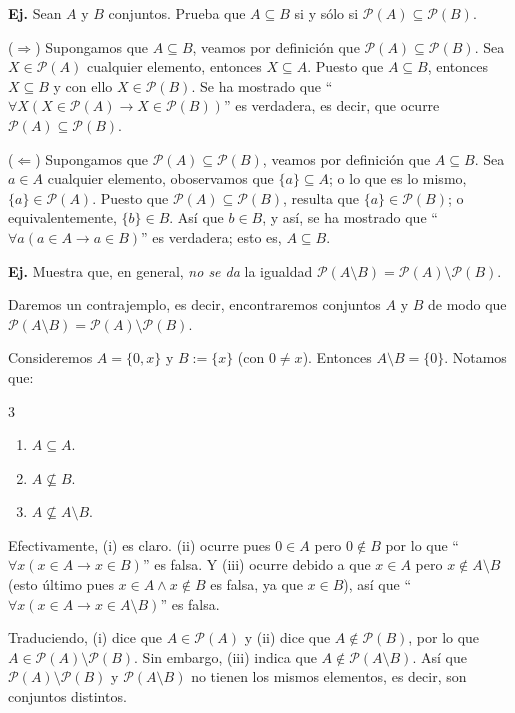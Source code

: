 \documentclass[letterpaper,DIV=14,headsepline,12pt]{scrartcl}
\makeatletter
\newcounter{Ejer}
\newcommand{\pts}{}
\newenvironment{ejercicio}[1]{\noindent
    \ifthenelse{\equal{#1}{1} \OR \equal{#1}{+1}}{\renewcommand{\pts}{\textbf{(#1 pt)}}}{\renewcommand{\pts}{\textbf{(#1 pts)}}}\textbf{Ej. \theEjer} \pts\stepcounter{Ejer}}{\vspace{.3cm}}
\renewenvironment{proof}[1][]{%
        \par\pushQED{\qed}%
        \normalfont\topsep6pt \partopsep0pt %
        \trivlist
        \item[\hskip\labelsep
                \textbf{\textit{Demostración.}}%
        ]#1
        }{%
        \popQED\endtrivlist\@endpefalse
    }
\newenvironment{solu}[1][]{%
        \par\pushQED{\hfill \lozenge}%
        \normalfont\topsep6pt \partopsep0pt %
        \trivlist
        \item[\hskip\labelsep
                \textbf{\textit{Solución.}}%
        ]#1
        }{%
        \popQED\endtrivlist\@endpefalse
    }
\makeatother
\begin{document}
    \begin{ejercicio}{1}
        Sean $A$ y $B$ conjuntos. Prueba que $A \subseteq B$ si y sólo si $\mathscr{P}(A) \subseteq \mathscr{P}(B)$.
    \end{ejercicio}
    \begin{proof}
        ($\Rightarrow$) Supongamos que $A \subseteq B$, veamos por definición que $\mathscr{P}(A) \subseteq \mathscr{P}(B)$. Sea $X \in \mathscr{P}(A)$ cualquier elemento, entonces $X \subseteq A$. Puesto que $A \subseteq B$, entonces $X \subseteq B$ y con ello $X \in \mathscr{P}(B)$. Se ha mostrado que ``$ \forall X (X \in \mathscr{P}(A) \to X \in \mathscr{P}(B)) $'' es verdadera, es decir, que ocurre $\mathscr{P}(A) \subseteq \mathscr{P}(B)$.

        ($\Leftarrow$) Supongamos que $\mathscr{P}(A) \subseteq \mathscr{P}(B)$, veamos por definición que $A \subseteq B$. Sea $a \in A$ cualquier elemento, oboservamos que $\{a\} \subseteq A$; o lo que es lo mismo, $\{a\} \in \mathscr{P}(A)$. Puesto que $\mathscr{P}(A) \subseteq \mathscr{P}(B)$, resulta que $\{a\} \in \mathscr{P}(B)$; o equivalentemente, $\{b\} \in B$. Así que $b \in B$, y así, se ha mostrado que ``$\forall a (a \in A \to a \in B)$'' es verdadera; esto es, $A \subseteq B$.
    \end{proof}

    \begin{ejercicio}{1}
        Muestra que, en general, \textit{no se da} la igualdad $\mathscr{P}(A \setminus B) = \mathscr{P}(A) \setminus \mathscr{P}(B)$.
    \end{ejercicio}
    \begin{solu}
        Daremos un contrajemplo, es decir, encontraremos conjuntos $A$ y $B$ de modo que $\mathscr{P}(A \setminus B) = \mathscr{P}(A) \setminus \mathscr{P}(B)$.

        Consideremos $A=\{0,x\}$ y $B:=\{x\}$ (con $0\neq x$). Entonces $A \setminus B=\{0\}$. Notamos que:
        \begin{multicols}{3}
            \begin{enumerate}
                \item $A \subseteq A$.
                \item $A \not\subseteq B$.
                \item $A \not\subseteq A \setminus B$.
            \end{enumerate}
        \end{multicols}
        Efectivamente, (i) es claro. (ii) ocurre pues $0 \in A$ pero $0 \notin B$ por lo que ``$\forall x (x \in A \to x \in B)$'' es falsa. Y (iii) ocurre debido a que $x \in A$ pero $x \notin A \setminus B$ (esto último pues $x \in A \land x \notin B$ es falsa, ya que $x \in B$), así que ``$\forall x (x \in A \to x \in A \setminus B)$'' es falsa.

        Traduciendo, (i) dice que $A \in \mathscr{P}(A)$ y (ii) dice que $A \notin \mathscr{P}(B)$, por lo que $A \in \mathscr{P}(A) \setminus \mathscr{P}(B)$. Sin embargo, (iii) indica que $A \notin \mathscr{P}(A \setminus B)$. Así que $\mathscr{P}(A) \setminus \mathscr{P}(B)$ y $\mathscr{P}(A \setminus B)$ no tienen los mismos elementos, es decir, son conjuntos distintos.
    \end{solu}
\end{document}
